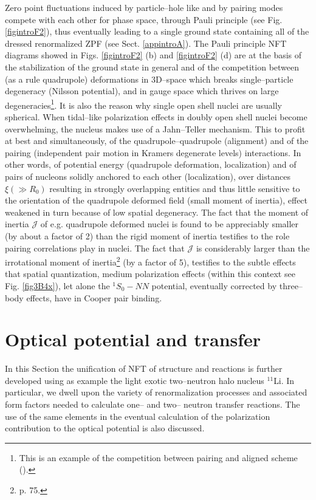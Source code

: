 Zero point fluctuations induced by particle--hole like and by pairing modes compete with each other for phase space, through Pauli principle (see Fig. \ref{figintroF2}), thus eventually leading to a single ground state containing all of the dressed renormalized ZPF (see Sect. \ref{appintroA}). The Pauli principle NFT diagrams showed in Figs. \ref{figintroF2} (b) and \ref{figintroF2} (d) are at the basis of the stabilization of the ground state in general and of the competition between (as a rule quadrupole) deformations in 3D--space which breaks single--particle degeneracy (Nilsson potential), and in gauge space which thrives on large degeneracies\footnote{This is an example of the competition between pairing and aligned scheme (\cite{Bayman:61,Bes:69,Mottelson:62,Bohr:75}).}. It is also the reason why single open shell nuclei are usually spherical. When tidal--like polarization effects in doubly open shell nuclei become overwhelming, the nucleus makes use of a Jahn--Teller mechanism. This to profit at best and simultaneously, of the quadrupole--quadrupole (alignment) and of the pairing (independent pair motion in Kramers degenerate levels) interactions. In other words, of potential energy (quadrupole deformation, localization) and of pairs of nucleons solidly anchored to each other (localization), over distances $\xi (\gg R_0)$ resulting in strongly overlapping entities and thus little sensitive to the orientation of the quadrupole deformed field (small moment of inertia), effect weakened in turn because of low spatial degeneracy. The fact that the moment of inertia $\mathcal J$ of e.g. quadrupole deformed nuclei is found to be appreciably smaller (by about a factor of 2) than the rigid moment of inertia testifies to the role pairing correlations play in nuclei. The fact that $\mathcal J$ is considerably larger than the irrotational moment of inertia\footnote{\cite{Bohr:75} p. 75.} (by a factor of 5), testifies to the subtle effects that spatial quantization, medium polarization effects (within this context see Fig. \ref{fig3B4x}), let alone the $^1S_0-NN$ potential, eventually corrected by  three--body effects, have in Cooper pair binding.
\newpage

\section{Optical potential and transfer}\label{C1S9}
In this Section the unification of NFT of structure and reactions is further developed using as example the light exotic two--neutron halo nucleus $^{11}$Li. In particular, we dwell upon the variety of renormalization processes and associated form factors needed to calculate one-- and two-- neutron transfer reactions. The use of the same elements in the eventual calculation of the polarization contribution to the optical potential is also discussed.  
